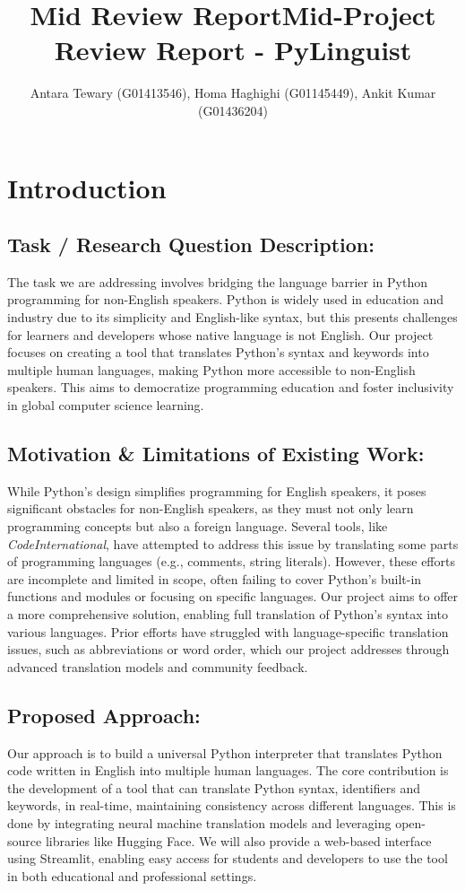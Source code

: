 \documentclass[9pt]{papertex}
\title{Mid Review Report}
\title{Mid-Project Review Report - PyLinguist} %
\author{Antara Tewary (G01413546), Homa Haghighi (G01145449), Ankit Kumar (G01436204)}
\begin{document}
\maketitle

\section{Introduction}
\subsection{Task / Research Question Description: }
The task we are addressing involves bridging the language barrier in Python programming for non-English speakers. Python is widely used in education and industry due to its simplicity and English-like syntax, but this presents challenges for learners and developers whose native language is not English. Our project focuses on creating a tool that translates Python's syntax and keywords into multiple human languages, making Python more accessible to non-English speakers. This aims to democratize programming education and foster inclusivity in global computer science learning. 

\subsection{Motivation \& Limitations of Existing Work: }
While Python's design simplifies programming for English speakers, it poses significant obstacles for non-English speakers, as they must not only learn programming concepts but also a foreign language. Several tools, like \textit{CodeInternational}, have attempted to address this issue by translating some parts of programming languages (e.g., comments, string literals). However, these efforts are incomplete and limited in scope, often failing to cover Python's built-in functions and modules or focusing on specific languages. Our project aims to offer a more comprehensive solution, enabling full translation of Python's syntax into various languages. Prior efforts have struggled with language-specific translation issues, such as abbreviations or word order, which our project addresses through advanced translation models and community feedback.

\subsection{Proposed Approach: }
Our approach is to build a universal Python interpreter that translates Python code written in English into multiple human languages. The core contribution is the development of a tool that can translate Python syntax, identifiers and keywords, in real-time, maintaining consistency across different languages. This is done by integrating neural machine translation models and leveraging open-source libraries like Hugging Face. We will also provide a web-based interface using Streamlit, enabling easy access for students and developers to use the tool in both educational and professional settings.  
\end{document}
